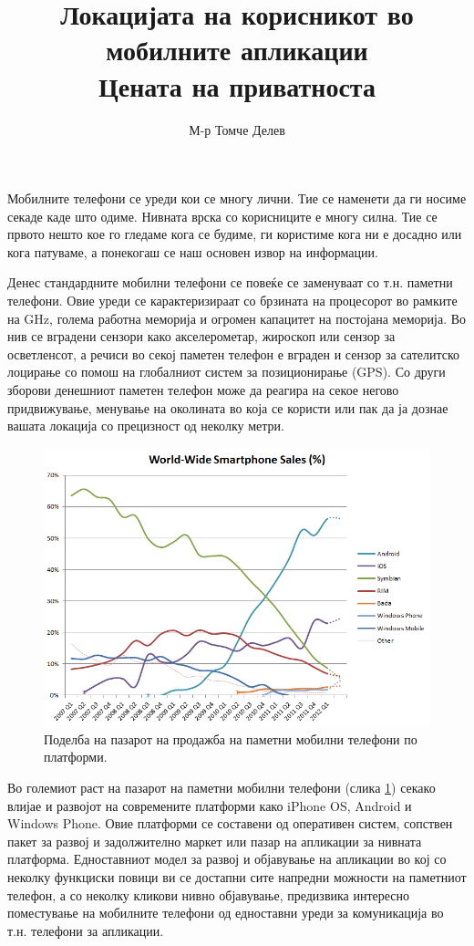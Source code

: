 \documentclass[12pt,a4paper]{article}
\title{Локацијата на корисникот во мобилните апликации\\Цената на приватноста}
\author{М-р Томче Делев}
\date{}
\begin{document}
\maketitle

Мобилните телефони се уреди кои се многу лични. Тие се наменети да ги носиме
секаде каде што одиме. Нивната врска со корисниците е многу силна. Тие се првото
нешто кое го гледаме кога се будиме, ги користиме кога ни е досадно или кога
патуваме, а понекогаш се наш основен извор на информации.

Денес стандардните мобилни телефони се повеќе се заменуваат со т.н. паметни
телефони. Овие уреди се карактеризираат со брзината на процесорот во рамките на
GHz, голема работна меморија и огромен капацитет на постојана меморија. Во нив
се вградени сензори како акселерометар, жироскоп или сензор за
осветленсот, а речиси во секој паметен телефон е вграден и сензор за сателитско
лоцирање со помош на глобалниот систем за позиционирање (GPS). Со други зборови денешниот паметен телефон може да
реагира на секое негово придвижување, менување на околината во која се користи
или пак да ја дознае вашата локација со прецизност од неколку метри. 

\begin{figure}[htb] \centering
\includegraphics[scale=0.4]{images/World_Wide_Smartphone_Sales_Share}
\caption{Поделба на пазарот на продажба на паметни мобилни телефони по
платформи.}
\label{fig:market_share}
\end{figure}
Во големиот раст на пазарот на паметни мобилни телефони
(слика \ref{fig:market_share}) секако влијае и развојот на современите
платформи како iPhone OS, Android и Windows Phone. Овие платформи се составени од оперативен систем, сопствен пакет
за развој и задолжително маркет или пазар на апликации за нивната
платформа. Едноставниот модел за развој и објавување на апликации во кој со
неколку функциски повици ви се достапни сите напредни можности на паметниот
телефон, а со неколку кликови нивно објавување, предизвика интересно поместување
на мобилните телефони од едноставни уреди за комуникација во т.н. телефони за
апликации.
\end{document}

